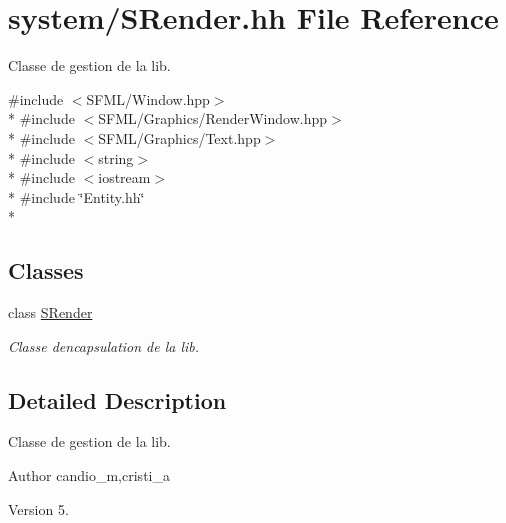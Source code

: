 \hypertarget{_s_render_8hh}{}\section{system/\+S\+Render.hh File Reference}
\label{_s_render_8hh}


Classe de gestion de la lib.  


{\ttfamily \#include $<$S\+F\+M\+L/\+Window.\+hpp$>$}\\*
{\ttfamily \#include $<$S\+F\+M\+L/\+Graphics/\+Render\+Window.\+hpp$>$}\\*
{\ttfamily \#include $<$S\+F\+M\+L/\+Graphics/\+Text.\+hpp$>$}\\*
{\ttfamily \#include $<$string$>$}\\*
{\ttfamily \#include $<$iostream$>$}\\*
{\ttfamily \#include \char`\"{}Entity.\+hh\char`\"{}}\\*
\subsection*{Classes}
\begin{DoxyCompactItemize}
\item 
class \hyperlink{class_s_render}{S\+Render}
\begin{DoxyCompactList}\small\item\em Classe d\textquotesingle{}encapsulation de la lib. \end{DoxyCompactList}\end{DoxyCompactItemize}


\subsection{Detailed Description}
Classe de gestion de la lib. 

\begin{DoxyAuthor}{Author}
candio\+\_\+m,cristi\+\_\+a 
\end{DoxyAuthor}
\begin{DoxyVersion}{Version}
5. 
\end{DoxyVersion}
